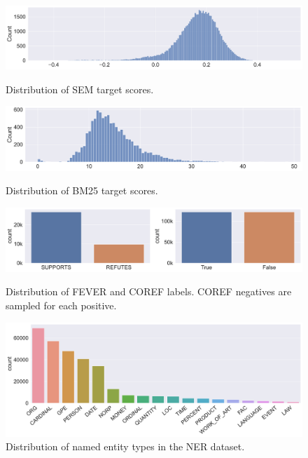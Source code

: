 \begin{figure}
    \centering
    \includegraphics[width=\textwidth]{gfx/probing/labels/sem}
    \caption{Distribution of SEM target scores.}

    \bigskip

    \centering
    \includegraphics[width=\textwidth]{gfx/probing/labels/bm25}
    \caption{Distribution of BM25 target scores.}

    \bigskip

    \centering
    \includegraphics[width=\textwidth]{gfx/probing/labels/fever_coref}
    \caption{Distribution of FEVER and COREF labels. COREF negatives are sampled for each positive.}

    \bigskip

    \centering
    \includegraphics[width=\textwidth]{gfx/probing/labels/ner}
    \caption{Distribution of named entity types in the NER dataset.}

\end{figure}
